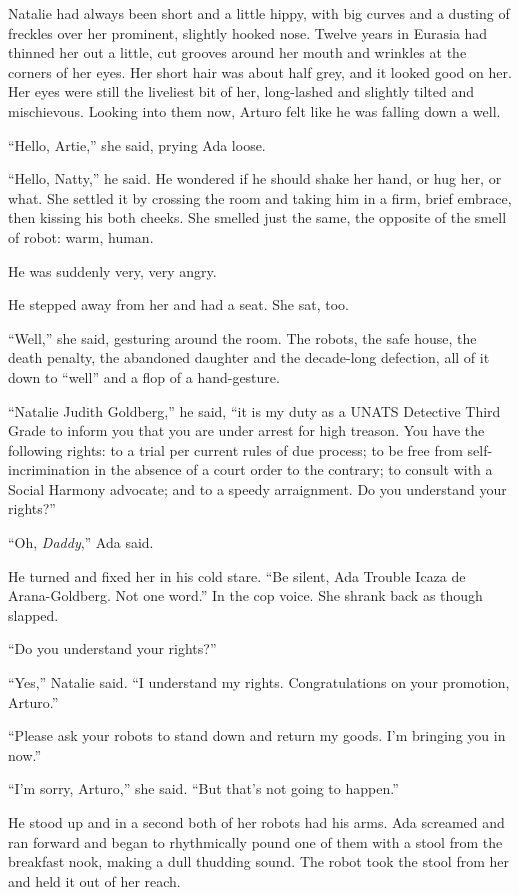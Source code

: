 Natalie had always been short and a little hippy, with big curves
and a dusting of freckles over her prominent, slightly hooked nose.
Twelve years in Eurasia had thinned her out a little, cut grooves
around her mouth and wrinkles at the corners of her eyes. Her short
hair was about half grey, and it looked good on her. Her eyes were
still the liveliest bit of her, long-lashed and slightly tilted and
mischievous. Looking into them now, Arturo felt like he was falling
down a well.

“Hello, Artie,” she said, prying Ada loose.

“Hello, Natty,” he said. He wondered if he should shake her hand,
or hug her, or what. She settled it by crossing the room and taking
him in a firm, brief embrace, then kissing his both cheeks. She
smelled just the same, the opposite of the smell of robot: warm,
human.

He was suddenly very, very angry.

He stepped away from her and had a seat. She sat, too.

“Well,” she said, gesturing around the room. The robots, the safe
house, the death penalty, the abandoned daughter and the
decade-long defection, all of it down to “well” and a flop of a
hand-gesture.

“Natalie Judith Goldberg,” he said, “it is my duty as a UNATS
Detective Third Grade to inform you that you are under arrest for
high treason. You have the following rights: to a trial per current
rules of due process; to be free from self-incrimination in the
absence of a court order to the contrary; to consult with a Social
Harmony advocate; and to a speedy arraignment. Do you understand
your rights?”

“Oh, \emph{Daddy},” Ada said.

He turned and fixed her in his cold stare. “Be silent, Ada Trouble
Icaza de Arana-Goldberg. Not one word.” In the cop voice. She
shrank back as though slapped.

“Do you understand your rights?”

“Yes,” Natalie said. “I understand my rights. Congratulations on
your promotion, Arturo.”

“Please ask your robots to stand down and return my goods. I’m
bringing you in now.”

“I’m sorry, Arturo,” she said. “But that’s not going to happen.”

He stood up and in a second both of her robots had his arms. Ada
screamed and ran forward and began to rhythmically pound one of
them with a stool from the breakfast nook, making a dull thudding
sound. The robot took the stool from her and held it out of her
reach.


